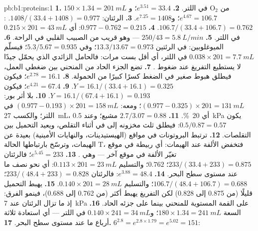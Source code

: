 \begin{solution}{pb:b1:proteins:1}
\textbf{1.} $150\times 1.34 = \qty{201}{mL}$ من $\mathrm{O_2}$ في اللتر.
\textbf{2.} $e^{3.51} = 33.4$؛ و$e^{4.67} = 106.7$؛
و$e^{7.25} = 1408$.
\textbf{3.} الرئتان: $1408/(33.4 + 1408) = 0.977$. :
$106.7/(33.4 + 106.7) = 0.762$.
\textbf{4.} $0.977 - 0.762 = 0.215$: أي $0.215\times 201 = \qty{43}{mL}$
في اللتر.
\textbf{5.} $250/43 = \qty{5.8}{L/min}$ --- وهو قريب من الصبيب
القلبي في الراحة.
\textbf{6.} الميوغلوبين: في الرئتين $13.3/13.67 = 0.973$؛ وفي
 $5.3/5.67 = 0.935$؛ فيسلّم $0.038\times 201 = \qty{7.7}{mL}$
في اللتر، أي أقل بست مرات: فالحامل الزائدي الذي يحمّل جيدًا لا يستطيع
التفريغ عند ضغوط .
\textbf{7.}  تضع الجزء الحاد من المنحني بين ضغطي العمل،
فيطلق هبوط صغير في الضغط كسرًا كبيرًا من الحمولة.
\textbf{8.} $e^{2.78} = 16.1$؛ فيكون $Y = 16.1/(33.4 + 16.1) = 0.325$.
\textbf{9.} $e^{4.21} = 67.4$؛ فيكون $Y = 16.1/(67.4 + 16.1) = 0.193$.
\textbf{10.} بلا أثر بور: $(0.977 - 0.325)\times 201 = \qty{131}{mL}$؛
ومعه: $(0.977 - 0.193)\times 201 = \qty{158}{mL}$ في اللتر؛ والكسب
\qty{27}{mL}، أي \qty{20}{\%}.
\textbf{11.} $2.7/3.07 = 0.88$ مشبع؛ وعند \qty{0.5}{kPa} يكون
$0.5/0.87 = 0.57$: فيطلق ثلث مخزونه إلى  في أثناء التقلص،
ويعيد التحميل بين التقلصات.
\textbf{12.} ترتبط البروتونات في مواقع (الهيستيدينات، والنهايات
الأمينية) بعيدة عن الهيمات، وترسّخ بارتباطها الحالة T، فتخفض الألفة
عند الهيمات: أي ربيطة في موقع تغيّر الألفة في موقع آخر --- وهي
.
\textbf{13.} $e^{5.45} = 233$؛ فالرئتان $233/(33.4 + 233) = 0.875$؛
 $0.762$؛ والتسليم $0.113\times 201 = \qty{23}{mL}$: أي نحو
نصف ما عند مستوى سطح البحر.
\textbf{14.} $e^{3.88} = 48.4$: فالرئتان $233/(48.4 + 233) = 0.828$؛
 $106.7/(48.4 + 106.7) = 0.688$؛ والتسليم
$0.140\times 201 =
\qty{28}{mL}$.
\textbf{15.} يهبط التحميل قليلًا (من 0.875 إلى 0.828) لكن التفريغ
يهبط أكثر (من 0.762 إلى 0.688)، فينمو الفرق: إذ ما تزال الرئتان عند
\qty{7}{kPa} على القمة المستوية للمنحني بينما  على جزئه الحاد.
\textbf{16.} السعة $180\times 1.34 = \qty{241}{mL}$؛
و$0.140\times
241 = \qty{34}{mL}$ في اللتر --- أي استعادة ثلاثة أرباع
ما عند مستوى سطح البحر.
\textbf{17.} $6^{2.8} = e^{2.8\times 1.79} = e^{5.02} = 151$:

\end{solution}
